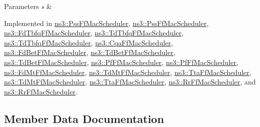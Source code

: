 \begin{DoxyParams}{Parameters}
{\em s} & \\
\hline
\end{DoxyParams}


Implemented in \hyperlink{classns3_1_1PssFfMacScheduler_a8f5a1ecdf9b7546b2f915c8b258beb9f}{ns3\+::\+Pss\+Ff\+Mac\+Scheduler}, \hyperlink{classns3_1_1PssFfMacScheduler_ab11028fccdb730ceb53f2239c4871ed5}{ns3\+::\+Pss\+Ff\+Mac\+Scheduler}, \hyperlink{classns3_1_1FdTbfqFfMacScheduler_a4f73838dc00dc8e3df05c138bfbee369}{ns3\+::\+Fd\+Tbfq\+Ff\+Mac\+Scheduler}, \hyperlink{classns3_1_1TdTbfqFfMacScheduler_ace0852121c7719227fd6f6daf2a175bd}{ns3\+::\+Td\+Tbfq\+Ff\+Mac\+Scheduler}, \hyperlink{classns3_1_1TdTbfqFfMacScheduler_aa04823cd675b273ac38dcc1863dd3659}{ns3\+::\+Td\+Tbfq\+Ff\+Mac\+Scheduler}, \hyperlink{classns3_1_1CqaFfMacScheduler_a6d95a5cdb82a3ad621f9dc6719f8cec2}{ns3\+::\+Cqa\+Ff\+Mac\+Scheduler}, \hyperlink{classns3_1_1FdBetFfMacScheduler_a547efd279a829fc1d6e9982e6c554698}{ns3\+::\+Fd\+Bet\+Ff\+Mac\+Scheduler}, \hyperlink{classns3_1_1TdBetFfMacScheduler_ae13bfa9442c59c4102f3f74addaec577}{ns3\+::\+Td\+Bet\+Ff\+Mac\+Scheduler}, \hyperlink{classns3_1_1TdBetFfMacScheduler_a3ee1609f48ba86d97d2d159dc0ebd7be}{ns3\+::\+Td\+Bet\+Ff\+Mac\+Scheduler}, \hyperlink{classns3_1_1PfFfMacScheduler_afa1704390f12e82562177e34113df9ab}{ns3\+::\+Pf\+Ff\+Mac\+Scheduler}, \hyperlink{classns3_1_1PfFfMacScheduler_ac871ac9e42f185a234071e9bbaa6a243}{ns3\+::\+Pf\+Ff\+Mac\+Scheduler}, \hyperlink{classns3_1_1FdMtFfMacScheduler_af8217fbce3c8424b0930729e952e5bee}{ns3\+::\+Fd\+Mt\+Ff\+Mac\+Scheduler}, \hyperlink{classns3_1_1TdMtFfMacScheduler_a743dbc12cc84f5f50a174e050686903e}{ns3\+::\+Td\+Mt\+Ff\+Mac\+Scheduler}, \hyperlink{classns3_1_1TtaFfMacScheduler_a574a79d890d7b5b081682b6e934aac93}{ns3\+::\+Tta\+Ff\+Mac\+Scheduler}, \hyperlink{classns3_1_1TdMtFfMacScheduler_a50c7fda519f75bdf1ab70509f6bd6cef}{ns3\+::\+Td\+Mt\+Ff\+Mac\+Scheduler}, \hyperlink{classns3_1_1TtaFfMacScheduler_aceb9cdcc8a3ac34414c76a02350faf34}{ns3\+::\+Tta\+Ff\+Mac\+Scheduler}, \hyperlink{classns3_1_1RrFfMacScheduler_a7b6d8b8371d4a8962891a6da503dc899}{ns3\+::\+Rr\+Ff\+Mac\+Scheduler}, and \hyperlink{classns3_1_1RrFfMacScheduler_a57634c71b6bd4827363f433bfe74fcdb}{ns3\+::\+Rr\+Ff\+Mac\+Scheduler}.



\subsection{Member Data Documentation}
